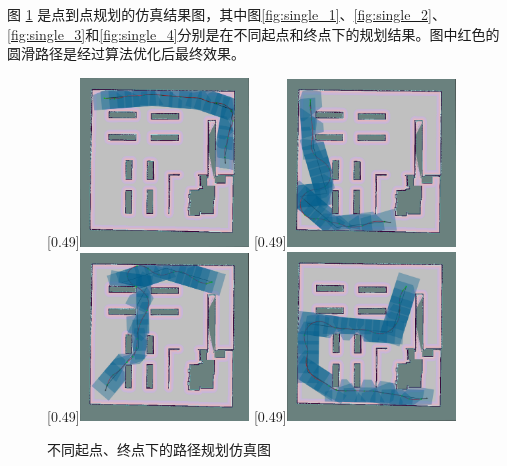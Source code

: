 \documentclass[master,academic]{ysuthesis} %
\begin{document}
		图 \ref{fig:点到点路径规划仿真案例} 是点到点规划的仿真结果图，其中图\ref{fig:single_1}、\ref{fig:single_2}、\ref{fig:single_3}和\ref{fig:single_4}分别是在不同起点和终点下的规划结果。图中红色的圆滑路径是经过算法优化后最终效果。
		\begin{figure}[!ht]
			\centering
			[0.49\textwidth]{\includegraphics[width=0.4\textwidth]{single_1.png}}
			[0.49\textwidth]{\includegraphics[width=0.4\textwidth]{single_2.png}}
			[0.49\textwidth]{\includegraphics[width=0.4\textwidth]{single_3.png}}
			[0.49\textwidth]{\includegraphics[width=0.4\textwidth]{single_4.png}}
			\caption{不同起点、终点下的路径规划仿真图}
			\label{fig:点到点路径规划仿真案例}
		\end{figure}
\end{document}
